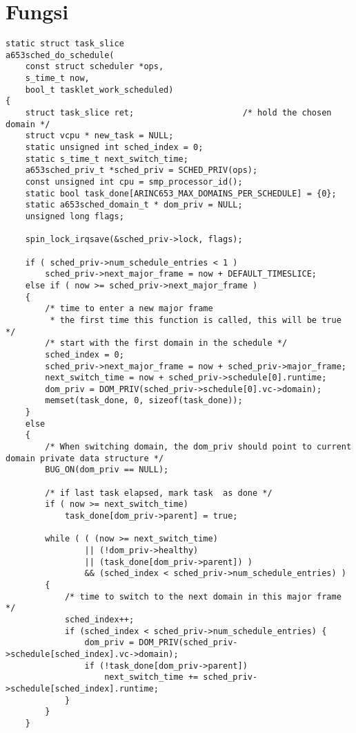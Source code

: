 \appendix
\chapter{Fungsi }
\label{appendix:a653sched_do_schedule}

\begin{lstlisting}
static struct task_slice
a653sched_do_schedule(
    const struct scheduler *ops,
    s_time_t now,
    bool_t tasklet_work_scheduled)
{
    struct task_slice ret;                      /* hold the chosen domain */
    struct vcpu * new_task = NULL;
    static unsigned int sched_index = 0;
    static s_time_t next_switch_time;
    a653sched_priv_t *sched_priv = SCHED_PRIV(ops);
    const unsigned int cpu = smp_processor_id();
    static bool task_done[ARINC653_MAX_DOMAINS_PER_SCHEDULE] = {0};
    static a653sched_domain_t * dom_priv = NULL;
    unsigned long flags;

    spin_lock_irqsave(&sched_priv->lock, flags);

    if ( sched_priv->num_schedule_entries < 1 )
        sched_priv->next_major_frame = now + DEFAULT_TIMESLICE;
    else if ( now >= sched_priv->next_major_frame )
    {
        /* time to enter a new major frame
         * the first time this function is called, this will be true */
        /* start with the first domain in the schedule */
        sched_index = 0;
        sched_priv->next_major_frame = now + sched_priv->major_frame;
        next_switch_time = now + sched_priv->schedule[0].runtime;
        dom_priv = DOM_PRIV(sched_priv->schedule[0].vc->domain);
        memset(task_done, 0, sizeof(task_done));
    }
    else
    {
        /* When switching domain, the dom_priv should point to current domain private data structure */
        BUG_ON(dom_priv == NULL);

        /* if last task elapsed, mark task  as done */
        if ( now >= next_switch_time) 
            task_done[dom_priv->parent] = true;

        while ( ( (now >= next_switch_time)
                || (!dom_priv->healthy)
                || (task_done[dom_priv->parent]) )
                && (sched_index < sched_priv->num_schedule_entries) )
        {
            /* time to switch to the next domain in this major frame */
            sched_index++;
            if (sched_index < sched_priv->num_schedule_entries) {
                dom_priv = DOM_PRIV(sched_priv->schedule[sched_index].vc->domain);
                if (!task_done[dom_priv->parent])
                    next_switch_time += sched_priv->schedule[sched_index].runtime;
            }
        }
    }


\end{lstlisting}

